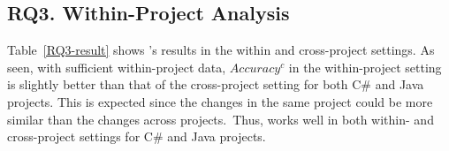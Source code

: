\subsection{{\bf RQ3. Within-Project Analysis}}




Table~\ref{RQ3-result} shows {\tool}'s results
in the within and cross-project settings. As seen, with sufficient
within-project data, $Accuracy^{c}$ in the within-project setting is
slightly better than that of the cross-project setting for
both C\# and Java projects.
This is expected since the changes in the same project could be more
similar than the changes across projects.~Thus, {\tool} works well in
both within- and cross-project settings for C\# and Java projects.




